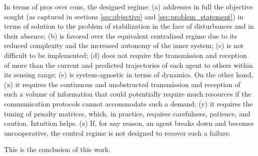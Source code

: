 In terms of pros over cons, the designed regime: (a) addresses in full the
objective sought (as captured in sections \eqref{sec:objective} and
\eqref{sec:problem_statement}) in terms of solution to the problem of
stabilization in the face of disturbances and in their absence; (b) is favored
over the equivalent centralized regime due to its reduced complexity and the
increased autonomy of the inner system; (c) is not difficult to be implemented;
(d) does not require the transmission and reception of more than the current and
predicted trajectories of each agent to others within its sensing range;
(e) is system-agnostic in terms of dynamics.
On the other hand, (x) it requires the continuous and unobstructed transmission
and reception of such a volume of information that could potentially require
much resources if the communication protocols cannot accommodate such a demand;
(y) it requires the tuning of penalty matrices, which, in practice,
requires carefulness, patience, and caution. Intuition helps. (z) If, for any
reason, an agent breaks down and becomes uncooperative, the control regime is
not designed to recover such a failure.

This is the conclusion of this work.
